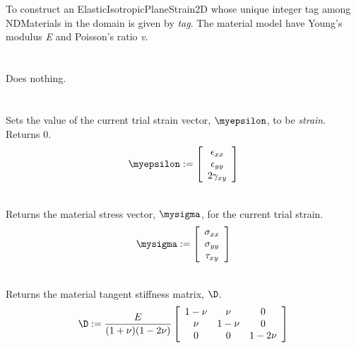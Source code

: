   \\
  \\
To construct an ElasticIsotropicPlaneStrain2D whose unique integer tag
among NDMaterials in the domain is given by {\em tag}.  The material
model have Young's modulus {\em E} and Poisson's ratio {\em v}. \\

 \\
 \\
Does nothing. \\ 

 \\
  \\
Sets the value of the current trial strain vector, $\myepsilon$,
to be {\em strain}. Returns $0$. \\

\begin{displaymath}
\myepsilon := \left[
   \begin{array}{c}
       \epsilon_{xx} \\
       \epsilon_{yy}   \\
       2 \gamma_{xy}   
   \end{array} 
 \right]
\end{displaymath}

 \\
Returns the material stress vector, $\mysigma$, for the current
trial strain. \\

\begin{displaymath}
\mysigma := \left[
   \begin{array}{c}
       \sigma_{xx} \\
       \sigma_{yy}   \\
       \tau_{xy}   
   \end{array} 
 \right]
\end{displaymath}

 \\
Returns the material tangent stiffness matrix, $\D$. \\

\begin{displaymath}
\D := \frac{E}{(1+\nu)(1-2\nu)} \left[
   \begin{array}{ccc}
         1-\nu &     \nu &      0 \\
           \nu &   1-\nu &      0 \\
             0 &       0 & 1-2\nu
   \end{array} 
 \right]
\end{displaymath}

